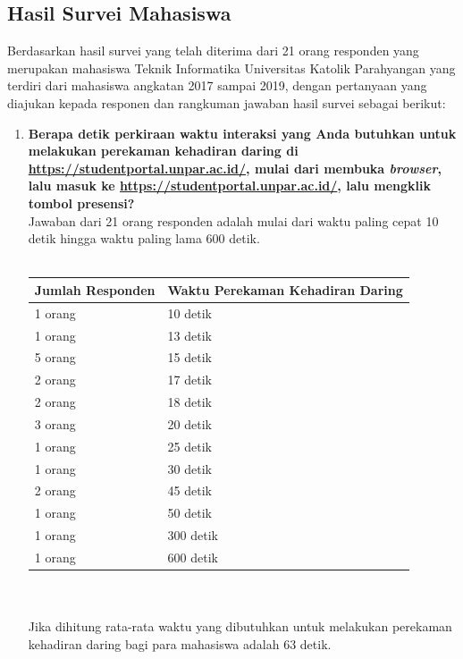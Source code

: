 \subsection{Hasil Survei Mahasiswa}
Berdasarkan hasil survei yang telah diterima dari 21 orang responden yang merupakan mahasiswa Teknik Informatika Universitas Katolik
Parahyangan yang terdiri dari mahasiswa angkatan 2017 sampai 2019, dengan pertanyaan yang diajukan kepada responen dan rangkuman jawaban hasil survei sebagai berikut:
\begin{enumerate}
	\item \textbf{Berapa detik perkiraan waktu interaksi yang Anda butuhkan untuk melakukan perekaman kehadiran daring di \url{https://studentportal.unpar.ac.id/}, mulai dari membuka \textit{browser}, lalu masuk ke \url{https://studentportal.unpar.ac.id/}, lalu mengklik tombol presensi?}\\
	Jawaban dari 21 orang responden adalah mulai dari waktu paling cepat 10 detik hingga waktu paling lama 600 detik.\\ \\
	 \begin{tabular}{|p{4cm} |p{7cm}|}
		\hline
		Jumlah Responden &  Waktu Perekaman Kehadiran Daring \\ \hline     
		1 orang &  10 detik\\ \hline 
		1 orang &  13 detik\\ \hline 
		5 orang &  15 detik\\ \hline 
		2 orang &  17 detik\\ \hline 
		2 orang &  18 detik\\ \hline 
		3 orang &  20 detik\\ \hline
		1 orang &  25 detik\\ \hline 
		1 orang &  30 detik\\ \hline 
		2 orang &  45 detik\\ \hline
		1 orang &  50 detik\\ \hline 
		1 orang &  300 detik\\ \hline 
		1 orang &  600 detik\\ \hline
	\end{tabular}\\ \\
	Jika dihitung rata-rata waktu yang dibutuhkan untuk melakukan perekaman kehadiran daring bagi para mahasiswa adalah 63 detik.
	

\end{enumerate}
